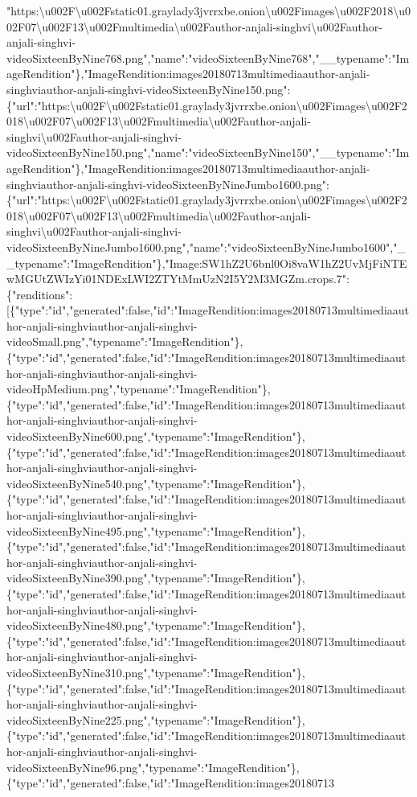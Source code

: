 "https:\textbackslash{}u002F\textbackslash{}u002Fstatic01.graylady3jvrrxbe.onion\textbackslash{}u002Fimages\textbackslash{}u002F2018\textbackslash{}u002F07\textbackslash{}u002F13\textbackslash{}u002Fmultimedia\textbackslash{}u002Fauthor-anjali-singhvi\textbackslash{}u002Fauthor-anjali-singhvi-videoSixteenByNine768.png","name":"videoSixteenByNine768","\_\_typename":"ImageRendition"\},"ImageRendition:images20180713multimediaauthor-anjali-singhviauthor-anjali-singhvi-videoSixteenByNine150.png":\{"url":"https:\textbackslash{}u002F\textbackslash{}u002Fstatic01.graylady3jvrrxbe.onion\textbackslash{}u002Fimages\textbackslash{}u002F2018\textbackslash{}u002F07\textbackslash{}u002F13\textbackslash{}u002Fmultimedia\textbackslash{}u002Fauthor-anjali-singhvi\textbackslash{}u002Fauthor-anjali-singhvi-videoSixteenByNine150.png","name":"videoSixteenByNine150","\_\_typename":"ImageRendition"\},"ImageRendition:images20180713multimediaauthor-anjali-singhviauthor-anjali-singhvi-videoSixteenByNineJumbo1600.png":\{"url":"https:\textbackslash{}u002F\textbackslash{}u002Fstatic01.graylady3jvrrxbe.onion\textbackslash{}u002Fimages\textbackslash{}u002F2018\textbackslash{}u002F07\textbackslash{}u002F13\textbackslash{}u002Fmultimedia\textbackslash{}u002Fauthor-anjali-singhvi\textbackslash{}u002Fauthor-anjali-singhvi-videoSixteenByNineJumbo1600.png","name":"videoSixteenByNineJumbo1600","\_\_typename":"ImageRendition"\},"Image:SW1hZ2U6bnl0Oi8vaW1hZ2UvMjFiNTEwMGUtZWIzYi01NDExLWI2ZTYtMmUzN2I5Y2M3MGZm.crops.7":\{"renditions":{[}\{"type":"id","generated":false,"id":"ImageRendition:images20180713multimediaauthor-anjali-singhviauthor-anjali-singhvi-videoSmall.png","typename":"ImageRendition"\},\{"type":"id","generated":false,"id":"ImageRendition:images20180713multimediaauthor-anjali-singhviauthor-anjali-singhvi-videoHpMedium.png","typename":"ImageRendition"\},\{"type":"id","generated":false,"id":"ImageRendition:images20180713multimediaauthor-anjali-singhviauthor-anjali-singhvi-videoSixteenByNine600.png","typename":"ImageRendition"\},\{"type":"id","generated":false,"id":"ImageRendition:images20180713multimediaauthor-anjali-singhviauthor-anjali-singhvi-videoSixteenByNine540.png","typename":"ImageRendition"\},\{"type":"id","generated":false,"id":"ImageRendition:images20180713multimediaauthor-anjali-singhviauthor-anjali-singhvi-videoSixteenByNine495.png","typename":"ImageRendition"\},\{"type":"id","generated":false,"id":"ImageRendition:images20180713multimediaauthor-anjali-singhviauthor-anjali-singhvi-videoSixteenByNine390.png","typename":"ImageRendition"\},\{"type":"id","generated":false,"id":"ImageRendition:images20180713multimediaauthor-anjali-singhviauthor-anjali-singhvi-videoSixteenByNine480.png","typename":"ImageRendition"\},\{"type":"id","generated":false,"id":"ImageRendition:images20180713multimediaauthor-anjali-singhviauthor-anjali-singhvi-videoSixteenByNine310.png","typename":"ImageRendition"\},\{"type":"id","generated":false,"id":"ImageRendition:images20180713multimediaauthor-anjali-singhviauthor-anjali-singhvi-videoSixteenByNine225.png","typename":"ImageRendition"\},\{"type":"id","generated":false,"id":"ImageRendition:images20180713multimediaauthor-anjali-singhviauthor-anjali-singhvi-videoSixteenByNine96.png","typename":"ImageRendition"\},\{"type":"id","generated":false,"id":"ImageRendition:images20180713